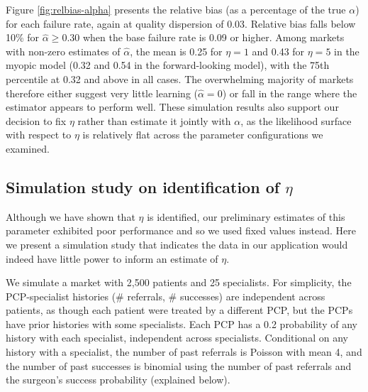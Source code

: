 \documentclass[12pt]{article}
\begin{document}
Figure \ref{fig:relbias-alpha} presents the relative bias (as a percentage of the true $\alpha$) for each failure rate, again at quality dispersion of 0.03. Relative bias falls below 10\% for $\hat\alpha \geq 0.30$ when the base failure rate is 0.09 or higher. Among markets with non-zero estimates of $\hat\alpha$, the mean is 0.25 for $\eta = 1$ and 0.43 for $\eta = 5$ in the myopic model (0.32 and 0.54 in the forward-looking model), with the 75th percentile at 0.32 and above in all cases. The overwhelming majority of markets therefore either suggest very little learning ($\hat\alpha = 0$) or fall in the range where the estimator appears to perform well. These simulation results also support our decision to fix $\eta$ rather than estimate it jointly with $\alpha$, as the likelihood surface with respect to $\eta$ is relatively flat across the parameter configurations we examined.


\subsection{Simulation study on identification of $\eta$}

Although we have shown that $\eta$ is identified, our preliminary estimates of this parameter exhibited poor performance and so we used fixed values instead. Here we present a simulation study that indicates the data in our application would indeed have little power to inform an estimate of $\eta$.

We simulate a market with 2,500 patients and 25 specialists. For simplicity, the PCP-specialist histories (\# referrals, \# successes) are independent across patients, as though each patient were treated by a different PCP, but the PCPs have prior histories with some specialists. Each PCP has a 0.2 probability of any history with each specialist, independent across specialists. Conditional on any history with a specialist, the number of past referrals is Poisson with mean 4, and the number of past successes is binomial using the number of past referrals and the surgeon's success probability (explained below).
\end{document}
